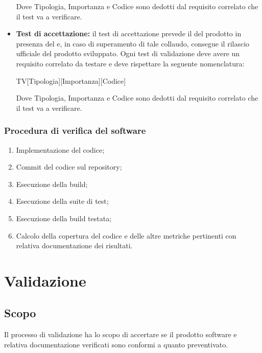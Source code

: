 \documentclass[../NormediProgetto.tex]{subfiles}
\begin{document}
\begin{itemize}
    Dove Tipologia, Importanza e Codice sono dedotti dal requisito correlato che il test va a verificare.

    \item \textbf{Test di accettazione:} il test di accettazione prevede il  del prodotto in presenza del  e, in caso di superamento di tale collaudo, consegue il rilascio ufficiale del prodotto sviluppato. Ogni test di validazione deve avere un requisito correlato da testare e deve rispettare la seguente nomenclatura:

    \begin{center}
        TV[Tipologia][Importanza][Codice]
    \end{center}

    Dove Tipologia, Importanza e Codice sono dedotti dal requisito correlato che il test va a verificare.

\end{itemize}


\subsubsection{Procedura di verifica del software}

\begin{enumerate}
    \item Implementazione del codice;
    
    \item Commit del codice sul repository;
    
    \item Esecuzione della build;
    
    \item Esecuzione della suite di test;
    
    \item Esecuzione della build testata;
    
    \item Calcolo della copertura del codice e delle altre metriche pertinenti con relativa documentazione dei risultati.
\end{enumerate}
    

\section{Validazione}

\subsection{Scopo}
Il processo di validazione ha lo scopo di accertare se il prodotto software e relativa documentazione verificati sono conformi a quanto preventivato.
\end{document}
